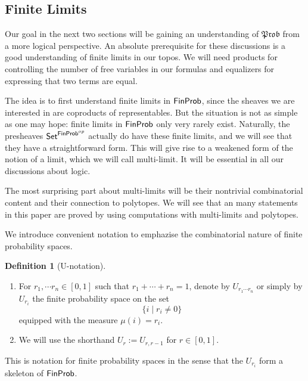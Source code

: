 \documentclass[a4paper]{amsproc}
\theoremstyle{plain}
\theoremstyle{definition}
\newtheorem{definition}[theorem]{Definition}
\theoremstyle{remark}
\numberwithin{equation}{section}
\newcommand{\Set}{\textup{\textsf{Set}}}
\newcommand{\FinProb}{\textup{\textsf{FinProb}}}
\newcommand{\Prob}{\mathfrak{Prob}}
\begin{document}
\subsection{Finite Limits}

Our goal in the next two sections will be gaining an understanding of $\Prob$ from a more logical perspective. An absolute prerequisite for these discussions is a good understanding of finite limits in our topos. We will need products for controlling the number of free variables in our formulas and equalizers for expressing that two terms are equal.

The idea is to first understand finite limits in $\FinProb$, since the sheaves we are interested in are coproducts of representables. But the situation is not as simple as one may hope: finite limits in $\FinProb$ only very rarely exist. Naturally, the presheaves $\Set^{\FinProb^{op}}$ actually do have these finite limits, and we will see that they have a straightforward form. This will give rise to a weakened form of the notion of a limit, which we will call multi-limit. It will be essential in all our discussions about logic.

The most surprising part about multi-limits will be their nontrivial combinatorial content and their connection to polytopes. We will see that an many statements in this paper are proved by using computations with multi-limits and polytopes.

We introduce convenient notation to emphazise the combinatorial nature of finite probability spaces.

\begin{definition}[U-notation] \label{U-notation}
    \mbox{}
    \begin{enumerate}
        \item For $r_1, \cdots r_n \in [0,1]$ such that $r_1 + \cdots + r_n = 1$, denote by $U_{r_1 \cdots r_n}$ or simply by $U_{r_i}$ the finite probability space on the set
        \[
        \{i \mid r_i \neq 0 \}
        \]
        equipped with the measure $\mu(i) = r_i$.
        \item We will use the shorthand $U_r := U_{r,r-1}$ for $r \in [0,1]$.
    \end{enumerate}
\end{definition}

This is notation for finite probability spaces in the sense that the $U_{r_i}$ form a skeleton of $\FinProb$.
\end{document}
